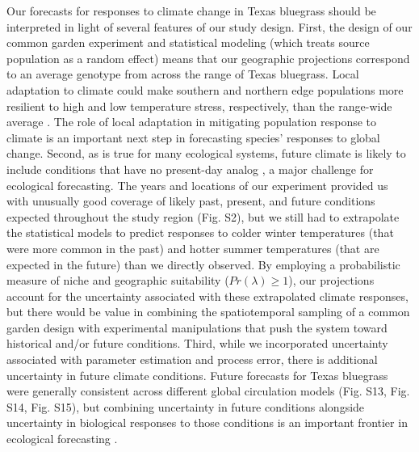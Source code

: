 \documentclass[9pt,twocolumn,twoside,lineno]{pnas-new}
\begin{document}
Our forecasts for responses to climate change in Texas bluegrass should be interpreted in light of several features of our study design. 
First, the design of our common garden experiment and statistical modeling (which treats source population as a random effect) means that our geographic projections correspond to an average genotype from across the range of Texas bluegrass. 
Local adaptation to climate could make southern and northern edge populations more resilient to high and low temperature stress, respectively, than the range-wide average \citep{angert2020we}. 
The role of local adaptation in mitigating population response to climate is an important next step in forecasting species' responses to global change.
Second, as is true for many ecological systems, future climate is likely to include conditions that have no present-day analog \citep{intergovernmental_panel_on_climate_change_ipcc_climate_2023}, a major challenge for ecological forecasting. 
The years and locations of our experiment provided us with unusually good coverage of likely past, present, and future conditions expected throughout the study region (Fig. S2), but we still had to extrapolate the statistical models to predict responses to colder winter temperatures (that were more common in the past) and hotter summer temperatures (that are expected in the future) than we directly observed. 
By employing a probabilistic measure of niche and geographic suitability ($Pr(\lambda)\ge1$), our projections account for the uncertainty associated with these extrapolated climate responses, but there would be value in combining the spatiotemporal sampling of a common garden design with experimental manipulations that push the system toward historical and/or future conditions. 
Third, while we incorporated uncertainty associated with parameter estimation and process error, there is additional uncertainty in future climate conditions. 
Future forecasts for Texas bluegrass were generally consistent across different global circulation models (Fig. S13, Fig. S14, Fig. S15), but combining uncertainty in future conditions alongside uncertainty in biological responses to those conditions is an important frontier in ecological forecasting \citep{dietze2018iterative}. 
\end{document}
